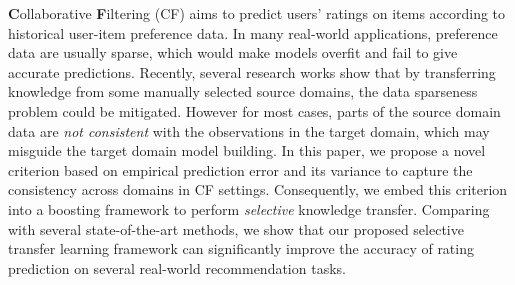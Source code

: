 {\bf C}ollaborative {\bf F}iltering (CF) aims to predict users' ratings on items according to historical user-item preference data. In many real-world applications, preference data are usually sparse, which would make models overfit and fail to give accurate predictions.
Recently, several research works show that by transferring knowledge from some manually selected source domains, the data sparseness problem could be mitigated.
However for most cases, parts of the source domain data are {\em not consistent} with the observations in the target domain, which may misguide the target domain model building.
In this paper, we propose a novel criterion based on empirical prediction error and its variance to capture the consistency across domains in CF settings. Consequently, we embed this criterion into a boosting framework to perform {\em selective} knowledge transfer.
Comparing with several state-of-the-art methods, we show that our proposed selective transfer learning framework can significantly improve the accuracy of rating prediction on several real-world recommendation tasks.
